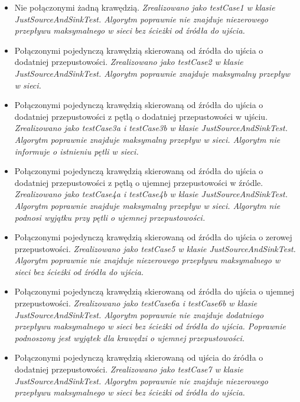 \begin{itemize}[nosep]
    \item Nie połączonymi żadną krawędzią.
    \emph{Zrealizowano jako testCase1 w klasie JustSourceAndSinkTest.
    Algorytm poprawnie nie znajduje niezerowego przepływu maksymalnego w sieci
    bez ścieżki od źródła do ujścia.}

    \item Połączonymi pojedynczą krawędzią skierowaną od źródła do ujścia o dodatniej przepustowości.
    \emph{Zrealizowano jako testCase2 w klasie JustSourceAndSinkTest.
    Algorytm poprawnie znajduje maksymalny przepływ w sieci.}

    \item Połączonymi pojedynczą krawędzią skierowaną od źródła do ujścia o dodatniej przepustowości z pętlą o dodatniej przepustowości w ujściu.
    \emph{Zrealizowano jako testCase3a i testCase3b w klasie JustSourceAndSinkTest.
    Algorytm poprawnie znajduje maksymalny przepływ w sieci. Algorytm
    nie informuje o istnieniu pętli w sieci.}

    \item Połączonymi pojedynczą krawędzią skierowaną od źródła do ujścia o dodatniej przepustowości z pętlą o ujemnej przepustowości w źródle.
    \emph{Zrealizowano jako testCase4a i testCase4b w klasie JustSourceAndSinkTest.
    Algorytm poprawnie znajduje maksymalny przepływ w sieci. Algorytm nie podnosi
    wyjątku przy pętli o ujemnej przepustowości.}

    \item Połączonymi pojedynczą krawędzią skierowaną od źródła do ujścia o zerowej przepustowości.
    \emph{Zrealizowano jako testCase5 w klasie JustSourceAndSinkTest.
    Algorytm poprawnie nie znajduje niezerowego przepływu maksymalnego w sieci
    bez ścieżki od źródła do ujścia.}

    \item Połączonymi pojedynczą krawędzią skierowaną od źródła do ujścia o ujemnej przepustowości.
    \emph{Zrealizowano jako testCase6a i testCase6b w klasie JustSourceAndSinkTest.
    Algorytm poprawnie nie znajduje dodatniego przepływu maksymalnego w sieci
    bez ścieżki od źródła do ujścia. Poprawnie podnoszony jest wyjątek dla krawędzi
    o ujemnej przepustowości.}

    \item Połączonymi pojedynczą krawędzią skierowaną od ujścia do źródła o dodatniej przepustowości.
    \emph{Zrealizowano jako testCase7 w klasie JustSourceAndSinkTest.
    Algorytm poprawnie nie znajduje niezerowego przepływu maksymalnego w sieci
    bez ścieżki od źródła do ujścia.}


\end{itemize}
